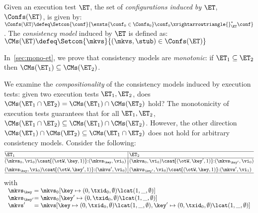 \begin{definition}
\label{def:cm}
Given an execution test $\ET$,  
the set of \emph{configurations induced by $\ET$},  $\Confs(\ET)$, is   given by: 
\(
\Confs(\ET)\defeq 
\Setcon{ \conf}{ 
	\exsts{\conf_0 \in \Confs_0}
	\conf_0 \xrightarrowtriangle{}_{\ET}^{*} \conf
}
\).
The \emph{consistency model} induced by $\ET$ is defined as:
\( 
\CMs(\ET) \defeq \Setcon{ \mkvs }{ (\mkvs, \stub) \in \Confs(\ET) }
\)
\end{definition}


\noindent In~\cref{sec:mono-et}, we prove that consistency models are 
\emph{monotonic}: 
if  $\ET_1 \subseteq \ET_2$ then $\CMs(\ET_1) \subseteq \CMs(\ET_2)$.

We examine the \emph{compositionality} of the consistency models induced by execution tests:  
\ie given two execution tests $\ET_1, \ET_2$, does 
$\CMs(\ET_1 \cap \ET_2) = \CMs(\ET_1) \cap \CMs(\ET_2)$ hold? 
The monotonicity of execution tests guarantees that 
 for all $\ET_1, \ET_2$, \( \CMs(\ET_1 \cap \ET_2) \subseteq \CMs(\ET_1) \cap \CMs(\ET_2) \). 
However, the other direction \( \CMs(\ET_1) \cap \CMs(\ET_2) \subseteq \CMs(\ET_1 \cap \ET_2) \) does not hold for arbitrary consistency models.
Consider the following:
%
\[
\small
\begin{array}{@{}l @{\hspace{2pt}} | @{\hspace{2pt}} l@{}}
    \hline
    \ET_1 & \ET_2 \\
%    
    \hline
    (\mkvs_{0}, \vi_{0}) \csat\! \{(\otW, \key, 1)\} {:} ( \mkvs_{\key}, \vi_{0})
    &
    (\mkvs_{0}, \vi_{0}) \csat\! \{(\otW, \key', 1)\} {:} ( \mkvs_{\key'}, \vi_{0}) 
    \vspace*{-7pt}\\\\
    (\mkvs_{\key}, \vi_{0}) \csat  \!\{(\otW, \key', 1)\} {:} (\mkvs',\vi_{0}) 
    &
    (\mkvs_{\key'}, \vi_{0}) \csat \!\{(\otW, \key, 1)\} {:} (\mkvs',\vi_{1}) 
    \\
\hline
\end{array}
\]%
%
with%
%
{
\(
\small
\begin{array}[t]{l@{} l}
    \mkvs_{\key} & = \mkvs_{0}[\key \mapsto (0, \txid_{0}, \emptyset) \lcat (1, \_, \emptyset)] \\
    \mkvs_{\key'} & = \mkvs_{0}[\key' \mapsto (0, \txid_{0}, \emptyset) \lcat (1, \_, \emptyset)] \\
    \mkvs' & = \mkvs[\key \mapsto (0, \txid_{0}, \emptyset) \lcat (1, \_, \emptyset) 
                ,\key' \mapsto (0, \txid_{0}, \emptyset) \lcat (1, \_, \emptyset)] \\
\end{array}
\)%
}%
%

